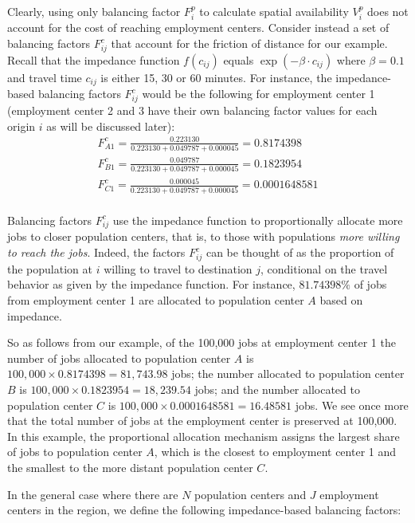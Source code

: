 \documentclass[10pt,letterpaper]{article}
\begin{document}
Clearly, using only balancing factor \(F^p_{i}\) to calculate spatial
availability \(V^p_i\) does not account for the cost of reaching
employment centers. Consider instead a set of balancing factors
\(F^c_{ij}\) that account for the friction of distance for our example.
Recall that the impedance function \(f(c_{ij})\) equals
\(\exp(-\beta\cdot c_{ij})\) where \(\beta = 0.1\) and travel time
\(c_{ij}\) is either 15, 30 or 60 minutes. For instance, the
impedance-based balancing factors \(F^c_{ij}\) would be the following
for employment center 1 (employment center 2 and 3 have their own
balancing factor values for each origin \(i\) as will be discussed
later): \[
\begin{array}{l}
F^c_{A1} = \frac{0.223130}{0.223130 + 0.049787 + 0.000045} = 0.8174398\\
F^c_{B1} = \frac{0.049787}{0.223130 + 0.049787 + 0.000045} = 0.1823954\\
F^c_{C1} = \frac{0.000045}{0.223130 + 0.049787 + 0.000045} = 0.0001648581\\
\end{array}
\]

Balancing factors \(F^c_{ij}\) use the impedance function to
proportionally allocate more jobs to closer population centers, that is,
to those with populations \emph{more willing to reach the jobs}. Indeed,
the factors \(F^c_{ij}\) can be thought of as the proportion of the
population at \(i\) willing to travel to destination \(j\), conditional
on the travel behavior as given by the impedance function. For instance,
\({81.74398}\%\) of jobs from employment center 1 are allocated to
population center \(A\) based on impedance.

So as follows from our example, of the 100,000 jobs at employment center
1 the number of jobs allocated to population center \(A\) is
\(100,000\times 0.8174398 = 81,743.98\) jobs; the number allocated to
population center \(B\) is \(100,000\times 0.1823954 = 18,239.54\) jobs;
and the number allocated to population center \(C\) is
\(100,000\times 0.0001648581 = 16.48581\) jobs. We see once more that
the total number of jobs at the employment center is preserved at
100,000. In this example, the proportional allocation mechanism assigns
the largest share of jobs to population center \(A\), which is the
closest to employment center 1 and the smallest to the more distant
population center \(C\).

In the general case where there are \(N\) population centers and \(J\)
employment centers in the region, we define the following
impedance-based balancing factors:
\end{document}
